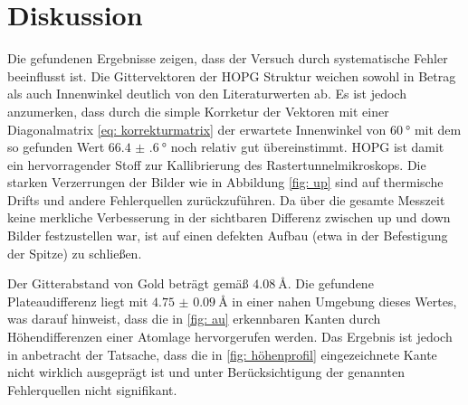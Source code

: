 \section{Diskussion}
Die gefundenen Ergebnisse zeigen, dass der Versuch durch systematische Fehler beeinflusst ist.
Die Gittervektoren der HOPG Struktur weichen sowohl in Betrag als auch Innenwinkel
deutlich von den Literaturwerten ab. Es ist jedoch anzumerken, dass durch die simple Korrketur der Vektoren
mit einer Diagonalmatrix \eqref{eq: korrekturmatrix} der erwartete Innenwinkel von $\SI{60}{\degree}$ mit dem so
gefunden Wert $\SI{66.4(6)}{\degree}$ noch relativ gut übereinstimmt. HOPG ist damit ein hervorragender Stoff
zur Kallibrierung des Rastertunnelmikroskops.
Die starken Verzerrungen der Bilder wie in Abbildung \ref{fig: up} sind auf thermische Drifts und andere Fehlerquellen
zurückzuführen. Da über die gesamte Messzeit keine merkliche Verbesserung in der sichtbaren Differenz zwischen
up und down Bilder festzustellen war, ist auf einen defekten Aufbau (etwa in der Befestigung der Spitze) zu schließen.

Der Gitterabstand von Gold beträgt gemäß \cite{gitterkonstanten} $\SI{4.08}{\angstrom}$. Die gefundene Plateaudifferenz
liegt mit $\SI{4.75(9)}{\angstrom}$ in einer nahen Umgebung dieses Wertes, was darauf hinweist,
dass die in \ref{fig: au} erkennbaren Kanten durch Höhendifferenzen einer Atomlage hervorgerufen werden.
Das Ergebnis ist jedoch in anbetracht der Tatsache,
dass die in \ref{fig: höhenprofil} eingezeichnete Kante nicht wirklich ausgeprägt ist
und unter Berücksichtigung der genannten Fehlerquellen nicht signifikant.
